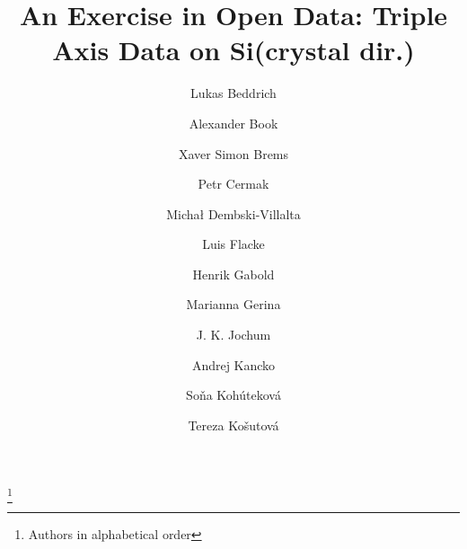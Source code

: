 \documentclass[aps,prx,reprint,amsmath,amssymb,superscriptaddress,showpacs]{revtex4-1}
\begin{document}

\title{An Exercise in Open Data: Triple Axis Data on Si(crystal dir.)}%
\thanks{Authors in alphabetical order}%

\author{Lukas Beddrich}
\address{Heinz Maier-Leibnitz Zentrum (MLZ), Technische Universit\"at M\"unchen, D-85748 Garching, Germany}

\author{Alexander Book}
\address{Technische Universit\"at M\"unchen, D-85748 Garching, Germany}

\author{Xaver Simon Brems}
\address{Heinz Maier-Leibnitz Zentrum (MLZ), Technische Universit\"at M\"unchen, D-85748 Garching, Germany}

\author{Petr Cermak}
\address{Charles University, Faculty of Mathematics and Physics, Department of Condensed Matter Physics}

\author{Michał Dembski-Villalta}
\address{Technische Universit\"at M\"unchen, D-85748 Garching, Germany}

\author{Luis Flacke}
\address{Walther Meißner Institut, Bayerische Akademie der Wissenschaften, Technische Universit\"at M\"unchen, D-85748 Garching, Germany}

\author{Henrik Gabold}
\address{Technische Universit\"at M\"unchen, D-85748 Garching, Germany}

\author{Marianna Gerina}
\address{Charles University, Faculty of Mathematics and Physics, Department of Condensed Matter Physics}

\author{J. K. Jochum}
\address{Heinz Maier-Leibnitz Zentrum (MLZ), Technische Universit\"at M\"unchen, D-85748 Garching, Germany}

\author{Andrej Kancko}
\address{Charles University, Faculty of Mathematics and Physics, Department of Condensed Matter Physics}

\author{Soňa Kohúteková}
\address{Charles University, Faculty of Science, Department of Inorganic Chemistry, Prague}

\author{Tereza Košutová}
\address{Charles University, Faculty of Mathematics and Physics, Department of Condensed Matter Physics}
\end{document}

